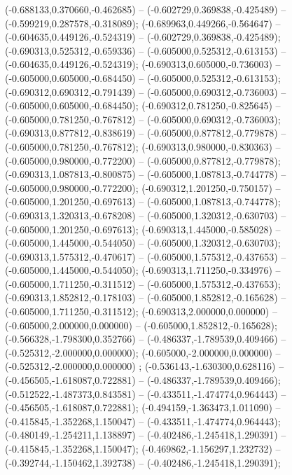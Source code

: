  (-0.688133,0.370660,-0.462685) -- (-0.602729,0.369838,-0.425489) -- (-0.599219,0.287578,-0.318089);
 (-0.689963,0.449266,-0.564647) -- (-0.604635,0.449126,-0.524319) -- (-0.602729,0.369838,-0.425489);
 (-0.690313,0.525312,-0.659336) -- (-0.605000,0.525312,-0.613153) -- (-0.604635,0.449126,-0.524319);
 (-0.690313,0.605000,-0.736003) -- (-0.605000,0.605000,-0.684450) -- (-0.605000,0.525312,-0.613153);
 (-0.690312,0.690312,-0.791439) -- (-0.605000,0.690312,-0.736003) -- (-0.605000,0.605000,-0.684450);
 (-0.690312,0.781250,-0.825645) -- (-0.605000,0.781250,-0.767812) -- (-0.605000,0.690312,-0.736003);
 (-0.690313,0.877812,-0.838619) -- (-0.605000,0.877812,-0.779878) -- (-0.605000,0.781250,-0.767812);
 (-0.690313,0.980000,-0.830363) -- (-0.605000,0.980000,-0.772200) -- (-0.605000,0.877812,-0.779878);
 (-0.690313,1.087813,-0.800875) -- (-0.605000,1.087813,-0.744778) -- (-0.605000,0.980000,-0.772200);
 (-0.690312,1.201250,-0.750157) -- (-0.605000,1.201250,-0.697613) -- (-0.605000,1.087813,-0.744778);
 (-0.690313,1.320313,-0.678208) -- (-0.605000,1.320312,-0.630703) -- (-0.605000,1.201250,-0.697613);
 (-0.690313,1.445000,-0.585028) -- (-0.605000,1.445000,-0.544050) -- (-0.605000,1.320312,-0.630703);
 (-0.690313,1.575312,-0.470617) -- (-0.605000,1.575312,-0.437653) -- (-0.605000,1.445000,-0.544050);
 (-0.690313,1.711250,-0.334976) -- (-0.605000,1.711250,-0.311512) -- (-0.605000,1.575312,-0.437653);
 (-0.690313,1.852812,-0.178103) -- (-0.605000,1.852812,-0.165628) -- (-0.605000,1.711250,-0.311512);
 (-0.690313,2.000000,0.000000) -- (-0.605000,2.000000,0.000000) -- (-0.605000,1.852812,-0.165628);
 (-0.566328,-1.798300,0.352766) -- (-0.486337,-1.789539,0.409466) -- (-0.525312,-2.000000,0.000000);
 (-0.605000,-2.000000,0.000000) -- (-0.525312,-2.000000,0.000000) ;
 (-0.536143,-1.630300,0.628116) -- (-0.456505,-1.618087,0.722881) -- (-0.486337,-1.789539,0.409466);
 (-0.512522,-1.487373,0.843581) -- (-0.433511,-1.474774,0.964443) -- (-0.456505,-1.618087,0.722881);
 (-0.494159,-1.363473,1.011090) -- (-0.415845,-1.352268,1.150047) -- (-0.433511,-1.474774,0.964443);
 (-0.480149,-1.254211,1.138897) -- (-0.402486,-1.245418,1.290391) -- (-0.415845,-1.352268,1.150047);
 (-0.469862,-1.156297,1.232732) -- (-0.392744,-1.150462,1.392738) -- (-0.402486,-1.245418,1.290391);
